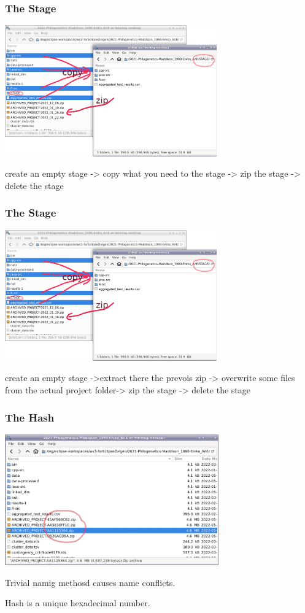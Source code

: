 \documentclass[aspectratio=169]{beamer}
\begin{document}
\begin{frame}
\frametitle<presentation>{The Stage}
\includegraphics[height=160pt]{pictures/project_folder_stageing.png}

  create an empty stage -> copy what you need to the stage -> zip the stage -> delete the stage
\end{frame}

\begin{frame}
\frametitle<presentation>{The Stage}
\includegraphics[height=160pt]{pictures/project_folder_stageing.png}

 create an empty stage ->extract there the prevois zip -> overwrite some files from the actual project folder-> zip the stage -> delete the stage
\end{frame}


\begin{frame}
\frametitle<presentation>{The Hash}
\includegraphics[height=160pt]{pictures/project_folder_with_hash_named_zips.png}

Trivial namig methosd causes name conflicts.

Hash is a unique hexadecimal number.
\end{frame}
\end{document}
